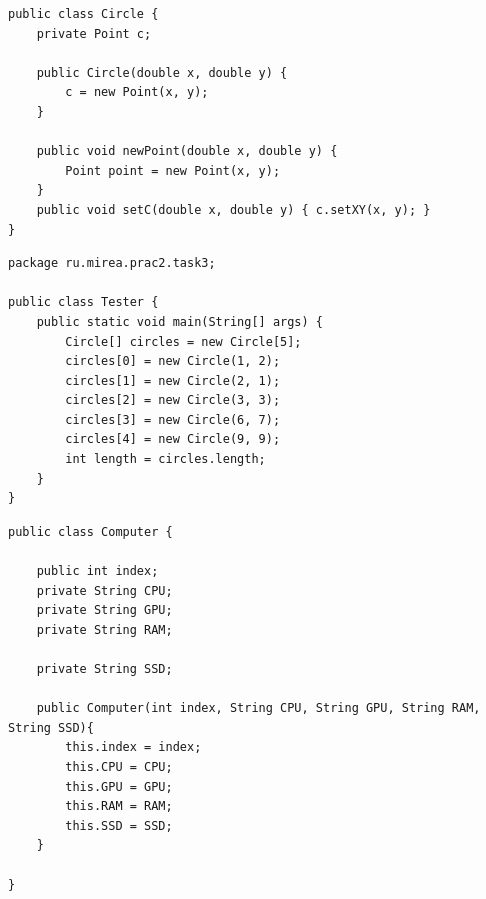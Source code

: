 \documentclass[14pt, a4paper]{extarticle}
\newenvironment{code}{\captionsetup{type=listing}}{}
\begin{document}
\begin{code}
\begin{Verbatim}[frame=single, fontsize=\footnotesize]
public class Circle {
    private Point c;

    public Circle(double x, double y) {
        c = new Point(x, y);
    }

    public void newPoint(double x, double y) {
        Point point = new Point(x, y);
    }
    public void setC(double x, double y) { c.setXY(x, y); }
}
\end{Verbatim}
\end{code}
\begin{code}
\begin{Verbatim}[frame=single, fontsize=\footnotesize]
package ru.mirea.prac2.task3;

public class Tester {
    public static void main(String[] args) {
        Circle[] circles = new Circle[5];
        circles[0] = new Circle(1, 2);
        circles[1] = new Circle(2, 1);
        circles[2] = new Circle(3, 3);
        circles[3] = new Circle(6, 7);
        circles[4] = new Circle(9, 9);
        int length = circles.length;
    }
}
\end{Verbatim}
\end{code}
\begin{code}
\begin{Verbatim}[frame=single, fontsize=\footnotesize]
public class Computer {

    public int index;
    private String CPU;
    private String GPU;
    private String RAM;

    private String SSD;

    public Computer(int index, String CPU, String GPU, String RAM, String SSD){
        this.index = index;
        this.CPU = CPU;
        this.GPU = GPU;
        this.RAM = RAM;
        this.SSD = SSD;
    }

}
\end{Verbatim}
\end{code}
\end{document}
